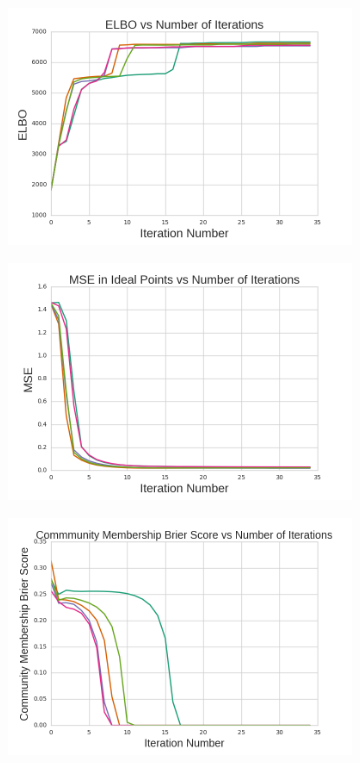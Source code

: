 \documentclass{article}
\begin{document}
\begin{figure}[h]
  \centering
    \begin{subfigure}[b]{0.3\textwidth}
        \includegraphics[width=\textwidth]{toy_elbos.png}
        \caption{}
    \end{subfigure}
          \begin{subfigure}[b]{0.3\textwidth}
        \includegraphics[width=\textwidth]{toy_ip_mse.png}
        \caption{}
    \end{subfigure}
        \begin{subfigure}[b]{0.3\textwidth}
        \includegraphics[width=\textwidth]{toy_resp_mse.png}

\end{subfigure}
\end{figure}
\end{document}
